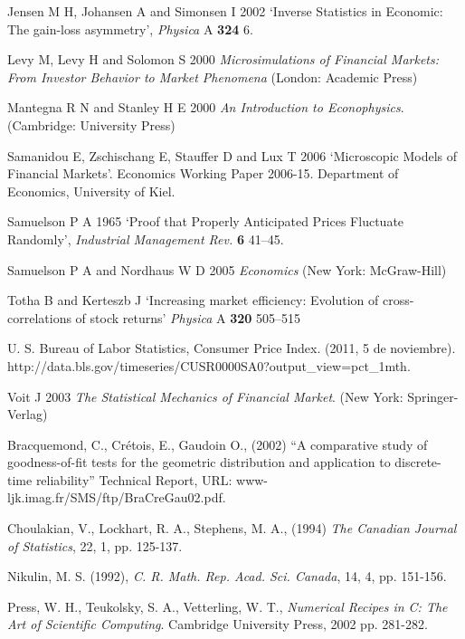 \documentclass[a4paper]{jpconf}
\begin{document}
\begin{thebibliography}{15}
Jensen M H, Johansen A and Simonsen I 2002 `Inverse Statistics in Economic: The gain-loss asymmetry', {\it Physica} A {\bf 324} 6.

Levy M, Levy H and Solomon S 2000 {\it Microsimulations of Financial Markets: From Investor Behavior to Market Phenomena} (London: Academic Press)

Mantegna R N and Stanley H E 2000 {\it An Introduction to Econophysics}. (Cambridge: University Press)

Samanidou E, Zschischang E, Stauffer D and Lux T 2006 `Microscopic Models of Financial Markets'. Economics Working Paper 2006-15. Department of Economics, University of Kiel.

Samuelson P A 1965 ‘Proof that Properly Anticipated Prices Fluctuate Randomly’, {\it Industrial Management Rev.} {\bf 6} 41--45.

Samuelson P A and Nordhaus W D 2005 {\it Economics} (New York: McGraw-Hill)

Totha B and Kerteszb J `Increasing market efficiency: Evolution of cross-correlations of stock returns' {\it Physica} A {\bf 320} 505--515

U. S. Bureau of Labor Statistics, Consumer Price Index. (2011, 5 de noviembre). http://data.bls.gov/timeseries/CUSR0000SA0?output\_view=pct\_1mth.

Voit J 2003 {\it The Statistical Mechanics of Financial Market}. (New York: Springer-Verlag)

Bracquemond, C., Cr\'{e}tois, E., Gaudoin O., (2002)
``A comparative study of goodness-of-fit tests for the geometric distribution and application
to discrete-time reliability'' Technical Report, URL: www-ljk.imag.fr/SMS/ftp/BraCreGau02.pdf.

Choulakian, V., Lockhart, R. A., Stephens, M. A., (1994)
{\it The Canadian Journal of Statistics}, 22, 1, pp. 125-137. 

Nikulin, M. S. (1992),
{\it C. R. Math. Rep. Acad. Sci. Canada}, 14, 4, pp. 151-156.

Press, W. H., Teukolsky, S. A., Vetterling, W. T.,
{\it Numerical Recipes in C: The Art of Scientific Computing}.
Cambridge University Press, 2002 pp. 281-282.

\end{thebibliography}
\end{document}
